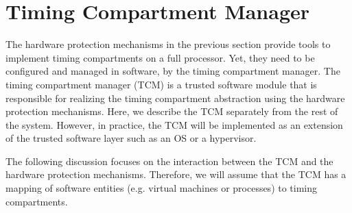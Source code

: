 % 

\section{Timing Compartment Manager}
\label{sec:integration_tcm}
The hardware protection mechanisms in the previous section provide tools
to implement timing compartments on a full processor. Yet, they need to be
configured and managed in software, by the timing compartment manager. 
The timing compartment manager (TCM) is a trusted software module that is
responsible for realizing the timing compartment abstraction using the
hardware protection mechanisms.
Here, we describe the TCM separately from the rest of the system.
However, in practice, the TCM will be implemented as an extension of the trusted software
layer such as an OS or a hypervisor.

The following discussion focuses on the interaction between the TCM and the 
hardware
protection mechanisms. Therefore, we will assume that the TCM has
a mapping of software entities (e.g. virtual machines or processes) to timing 
compartments.


